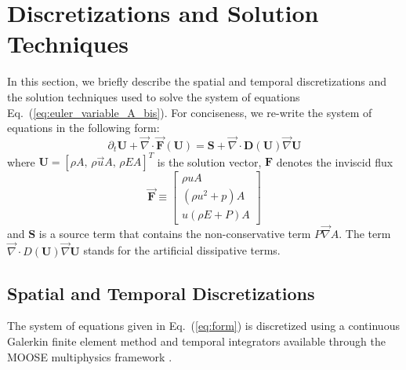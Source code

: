 \documentclass[review,10pt]{elsarticle}
\renewcommand{\div}{\vec{\nabla}\! \cdot \!}
\newcommand{\grad}{\vec{\nabla}}
\newcommand{\eqt}[1]{Eq.~(\ref{#1})}                     %
\begin{document}
\section{Discretizations and Solution Techniques} \label{sec:solution_tech}

In this section, we briefly describe the spatial and temporal discretizations and the solution techniques 
used to solve the system of equations \eqt{eq:euler_variable_A_bis}. For conciseness, we re-write the system of 
equations in the following form:
\begin{equation}
\label{eq:form}
\partial_t \mathbf{U} + \div \vec{\mathbf{F}}\left( \mathbf{U} \right) = \mathbf{S} + \div \mathbf{D}(\mathbf{U}) \grad \mathbf{U}
\end{equation}
where $\mathbf{U}=[\rho A,\, \rho \vec{u} A,\, \rho E A]^T$ is the solution vector, $\mathbf{F}$ denotes the inviscid flux 
\begin{equation}
  \vec{\mathbf{F}} \equiv
  \begin{bmatrix}
    \rho u A                     \\
    \left(\rho u^2 + p\right) A  \\
    u (\rho E +P) A
  \end{bmatrix}
\end{equation}
and $\mathbf{S}$ is a source term that contains the non-conservative term $P\grad A$. The term 
$\div D(\mathbf{U}) \grad \mathbf{U}$ stands for the artificial dissipative terms. 

\subsection{Spatial and Temporal Discretizations} \label{sec:disc}
The system of equations given in \eqt{eq:form} is discretized using a continuous Galerkin finite element 
method and temporal integrators available through the MOOSE multiphysics framework \cite{MOOSE}.
\end{document}
